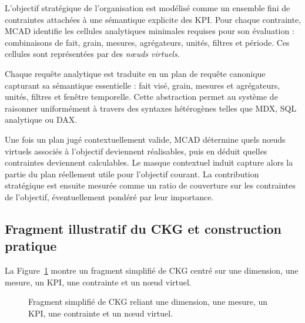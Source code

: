 \documentclass[journal]{IEEEtran}
\begin{document}
L'objectif stratégique de l'organisation est modélisé comme un ensemble fini de contraintes attachées à une sémantique explicite des KPI. Pour chaque contrainte, MCAD identifie les cellules analytiques minimales requises pour son évaluation : combinaisons de fait, grain, mesures, agrégateurs, unités, filtres et période. Ces cellules sont représentées par des \emph{nœuds virtuels}.

Chaque requête analytique est traduite en un plan de requête canonique capturant sa sémantique essentielle : fait visé, grain, mesures et agrégateurs, unités, filtres et fenêtre temporelle. Cette abstraction permet au système de raisonner uniformément à travers des syntaxes hétérogènes telles que MDX, SQL analytique ou DAX.

Une fois un plan jugé contextuellement valide, MCAD détermine quels nœuds virtuels associés à l'objectif deviennent réalisables, puis en déduit quelles contraintes deviennent calculables. Le masque contextuel induit capture alors la partie du plan réellement utile pour l'objectif courant. La contribution stratégique est ensuite mesurée comme un ratio de couverture sur les contraintes de l'objectif, éventuellement pondéré par leur importance.

\subsection{Fragment illustratif du CKG et construction pratique}

La Figure~\ref{fig:ckg-fragment} montre un fragment simplifié de CKG centré sur une dimension, une mesure, un KPI, une contrainte et un nœud virtuel.

\begin{figure}[!t]
\centering
{}
\caption{Fragment simplifié de CKG reliant une dimension, une mesure, un KPI, une contrainte et un nœud virtuel.}
\label{fig:ckg-fragment}
\end{figure}
\end{document}

